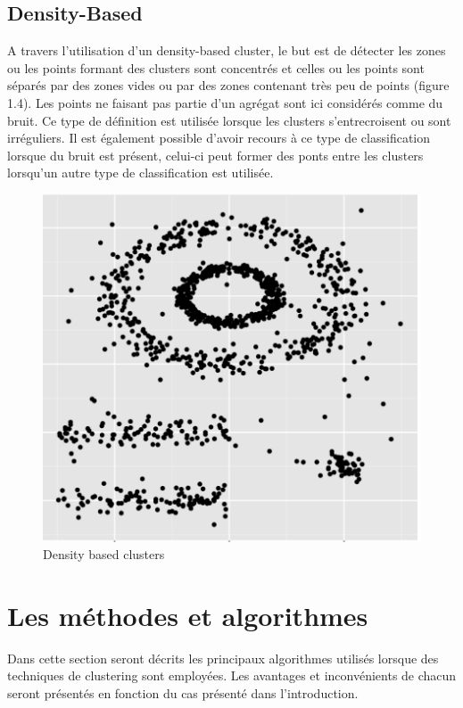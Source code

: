 \documentclass[memoire.tex]{subfiles}
\begin{document}
\subsection{Density-Based}
A travers l'utilisation d'un density-based cluster, le but est de détecter les zones ou les points formant des clusters sont concentrés et celles ou les points sont séparés par des zones vides ou par des zones contenant très peu de points (figure 1.4). Les points ne faisant pas partie d'un agrégat sont ici considérés comme du bruit. Ce type de définition est utilisée lorsque les clusters s'entrecroisent ou sont irréguliers.\cite{ref4} Il est également possible d'avoir recours à ce type de classification lorsque du bruit est présent, celui-ci peut former des ponts entre les clusters lorsqu'un autre type de classification est utilisée.
	\begin{figure}[h!]
		\centerline{\includegraphics[scale=0.8]{img/density_cluster.png}}
		\caption{Density based clusters}
	\end{figure}

\newpage
\section{Les méthodes et algorithmes}
Dans cette section seront décrits les principaux algorithmes utilisés lorsque des techniques de clustering sont employées. Les avantages et inconvénients de chacun seront présentés en fonction du cas présenté dans l'introduction.
\end{document}
